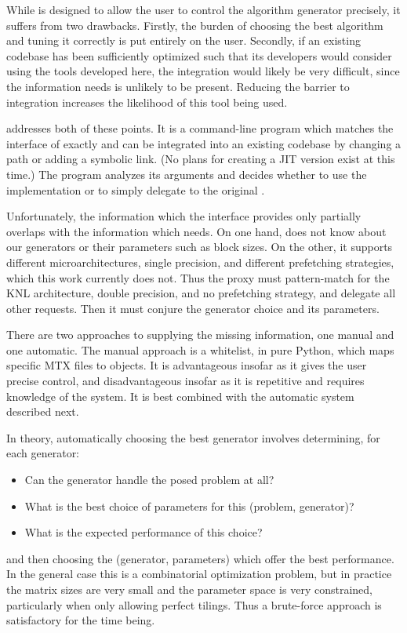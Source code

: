 While  is designed to allow the user to control the algorithm generator precisely, it suffers from two drawbacks. Firstly, the burden of choosing the best algorithm and tuning it correctly is put entirely on the user. Secondly, if an existing codebase has been sufficiently optimized such that its developers would consider using the tools developed here, the integration would likely be very difficult, since the information  needs is unlikely to be present. Reducing the barrier to integration increases the likelihood of this tool being used.

 addresses both of these points. It is a command-line program which matches the interface of  exactly and can be integrated into an existing codebase by changing a path or adding a symbolic link. (No plans for creating a JIT version exist at this time.) The program analyzes its arguments and decides whether to use the  implementation or to simply delegate to the original .

Unfortunately, the information which the  interface provides only partially overlaps with the information which  needs. On one hand,  does not know about our generators or their parameters such as block sizes. On the other, it supports different microarchitectures, single precision, and different prefetching strategies, which this work currently does not. Thus the proxy must pattern-match for the KNL architecture, double precision, and no prefetching strategy, and delegate all other requests. Then it must conjure the generator choice and its parameters.

There are two approaches to supplying the missing information, one manual and one automatic. The manual approach is a whitelist, in pure Python, which maps specific MTX files to  objects. It is advantageous insofar as it gives the user precise control, and disadvantageous insofar as it is repetitive and requires knowledge of the system. It is best combined with the automatic system described next.

In theory, automatically choosing the best generator involves determining, for each generator:
\begin{itemize}
  \item{Can the generator handle the posed problem at all?}
  \item{What is the best choice of parameters for this (problem, generator)?}
  \item{What is the expected performance of this choice?}
\end{itemize}
and then choosing the (generator, parameters) which offer the best performance. In the general case this is a combinatorial optimization problem, but in practice the matrix sizes are very small and the parameter space is very constrained, particularly when only allowing perfect tilings. Thus a brute-force approach is satisfactory for the time being. 

